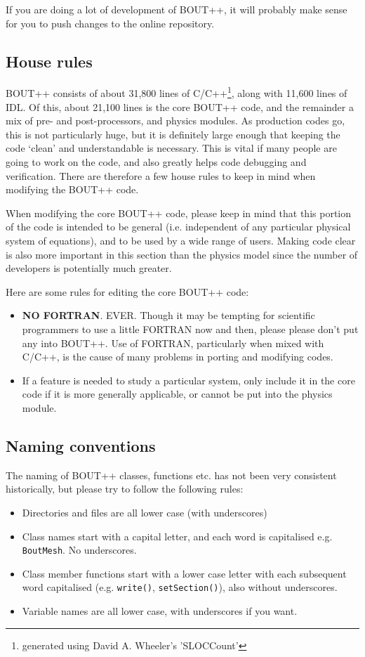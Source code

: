 \documentclass[12pt]{article}
\newcommand{\code}[1]{\texttt{#1}}
\begin{document}
If you are doing a lot of development of BOUT++, it will probably make sense
for you to push changes to the online repository.

\subsection{House rules}

BOUT++ consists of about 31,800 lines of C/C++\footnote{generated using
David A. Wheeler's 'SLOCCount'},
along with 11,600 lines of IDL. Of this, about 21,100 lines is the core
BOUT++ code, and the remainder
a mix of pre- and post-processors, and physics modules. As production codes
go, this is not particularly huge, but it is definitely large enough that
keeping the code `clean' and understandable is necessary. This is vital
if many people are going to work on the code, and also greatly helps code
debugging and verification. There are therefore a few house rules to keep
in mind when modifying the BOUT++ code.

When modifying the core BOUT++ code, please keep in mind that this portion of the code
is intended to be general (i.e. independent of any particular physical system of equations),
and to be used by a wide range of users. Making code clear is also more important
in this section than the physics model since the number of developers is potentially
much greater. 

Here are some rules for editing the core BOUT++ code:
\begin{itemize}
\item {\bf NO FORTRAN}. EVER. Though it may be tempting for scientific programmers to use
a little FORTRAN now and then, please please don't put any into BOUT++. 
Use of FORTRAN, particularly when mixed with C/C++, is the cause of many problems in
porting and modifying codes. 
\item If a feature is needed to study a particular system, only include it in the
core code if it is more generally applicable, or cannot be put into the physics module.
\end{itemize}

\subsection{Naming conventions}

The naming of BOUT++ classes, functions etc. has not been very consistent
historically, but please try to follow the following rules:
\begin{itemize}
\item Directories and files are all lower case (with underscores)
\item Class names start with a capital letter, and each word is capitalised e.g. \code{BoutMesh}. No underscores.
\item Class member functions start with a lower case letter with each subsequent word capitalised (e.g. \code{write()}, \code{setSection()}), also without underscores.
\item Variable names are all lower case, with underscores if you want.
\end{itemize}
\end{document}
